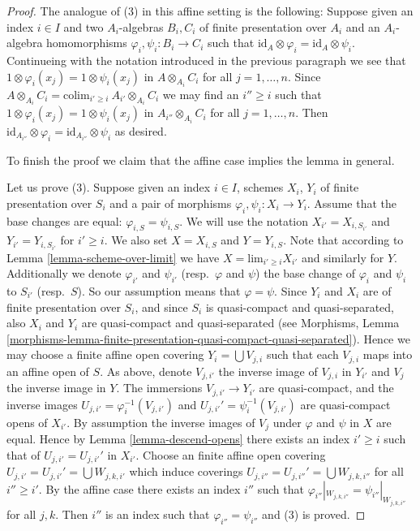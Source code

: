 \begin{proof}
\medskip\noindent
The analogue of (3) in this affine setting is the following:
Suppose given an index $i \in I$ and two $A_i$-algebras
$B_i, C_i$ of finite presentation over $A_i$ and an $A_i$-algebra
homomorphisms $\varphi_i, \psi_i : B_i \to C_i$ such that
$\text{id}_A \otimes \varphi_i = \text{id}_A \otimes \psi_i$.
Continueing with the notation introduced in the previous paragraph
we see that $1 \otimes \varphi_i(x_j) = 1 \otimes \psi_i(x_j)$
in $A \otimes_{A_i} C_i$ for all $j = 1, \ldots, n$. Since 
$A \otimes_{A_i} C_i = \text{colim}_{i' \geq i}\ A_{i'} \otimes_{A_i} C_i$
we may find an $i'' \geq i$ such that
$1 \otimes \varphi_i(x_j) = 1 \otimes \psi_i(x_j)$
in $A_{i''} \otimes_{A_i} C_i$ for all $j = 1, \ldots, n$.
Then
$\text{id}_{A_{i''}} \otimes \varphi_i = \text{id}_{A_{i''}} \otimes \psi_i$
as desired.

\medskip\noindent
To finish the proof we claim that the affine case implies
the lemma in general.

\medskip\noindent
Let us prove (3). Suppose given an index $i \in I$, schemes
$X_i$, $Y_i$ of finite presentation over $S_i$ and a pair of morphisms
$\varphi_i, \psi_i : X_i \to Y_i$. Assume that the base changes are
equal: $\varphi_{i, S} = \psi_{i, S}$. We will use the notation
$X_{i'} = X_{i, S_{i'}}$ and $Y_{i'} = Y_{i, S_{i'}}$ for
$i' \geq i$. We also set $X = X_{i, S}$ and $Y = Y_{i, S}$.
Note that according to Lemma \ref{lemma-scheme-over-limit} we have
$X = \text{lim}_{i' \geq i} X_{i'}$ and similarly for $Y$.
Additionally we denote $\varphi_{i'}$ and $\psi_{i'}$
(resp.\ $\varphi$ and $\psi$)
the base change of $\varphi_i$ and $\psi_i$ to $S_{i'}$
(resp.\ $S$). So our assumption means that $\varphi = \psi$.
Since $Y_i$ and $X_i$ are of finite presentation
over $S_i$, and since $S_i$ is quasi-compact and quasi-separated, also
$X_i$ and $Y_i$ are quasi-compact and quasi-separated
(see Morphisms,
Lemma \ref{morphisms-lemma-finite-presentation-quasi-compact-quasi-separated}).
Hence we may choose a finite affine open covering
$Y_i = \bigcup V_{j, i}$ such that each $V_{j, i}$ maps into
an affine open of $S$. As above, denote $V_{j, i'}$ the inverse
image of $V_{j, i}$ in $Y_{i'}$ and $V_j$ the inverse image in $Y$.
The immersions $V_{j, i'} \to Y_{i'}$ are quasi-compact, and the inverse images
$U_{j, i'} = \varphi_i^{-1}(V_{j, i'})$ and
$U_{j, i'}' = \psi_i^{-1}(V_{j, i'})$
are quasi-compact opens of $X_{i'}$. By assumption the inverse images of
$V_j$ under $\varphi$ and $\psi$ in $X$ are equal.
Hence by Lemma \ref{lemma-descend-opens}
there exists an index $i' \geq i$ such that
of $U_{j, i'} = U_{j, i'}'$ in $X_{i'}$.
Choose an finite affine open covering
$U_{j, i'} = U_{j, i'}' = \bigcup W_{j, k, i'}$
which induce coverings $U_{j, i''} = U_{j, i''}' = \bigcup W_{j, k, i''}$
for all $i'' \geq i'$.
By the affine case there exists 
an index $i''$ such that
$\varphi_{i''}|_{W_{j, k, i''}} = \psi_{i''}|_{W_{j, k, i''}}$
for all $j, k$. Then $i''$ is an index such that
$\varphi_{i''} = \psi_{i''}$ and (3) is proved.


\end{proof}
